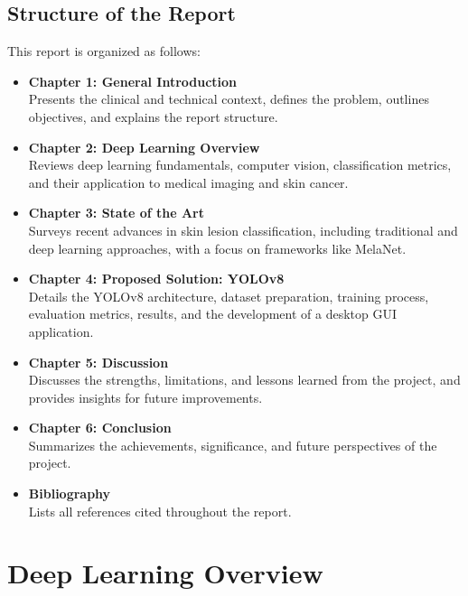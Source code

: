 \documentclass[a4paper,12pt]{report}
\begin{document}
\begin{spacing}{1.5}
    \section{Structure of the Report}
    This report is organized as follows:

    \begin{itemize}
        \item \textbf{Chapter 1: General Introduction} \\
        Presents the clinical and technical context, defines the problem, outlines objectives, and explains the report structure.

        \item \textbf{Chapter 2: Deep Learning Overview} \\
        Reviews deep learning fundamentals, computer vision, classification metrics, and their application to medical imaging and skin cancer.

        \item \textbf{Chapter 3: State of the Art} \\
        Surveys recent advances in skin lesion classification, including traditional and deep learning approaches, with a focus on frameworks like MelaNet.

        \item \textbf{Chapter 4: Proposed Solution: YOLOv8} \\
        Details the YOLOv8 architecture, dataset preparation, training process, evaluation metrics, results, and the development of a desktop GUI application.

        \item \textbf{Chapter 5: Discussion} \\
        Discusses the strengths, limitations, and lessons learned from the project, and provides insights for future improvements.

        \item \textbf{Chapter 6: Conclusion} \\
        Summarizes the achievements, significance, and future perspectives of the project.

        \item \textbf{Bibliography} \\
        Lists all references cited throughout the report.
    \end{itemize}


\chapter{Deep Learning Overview}


\end{spacing}
\end{document}
